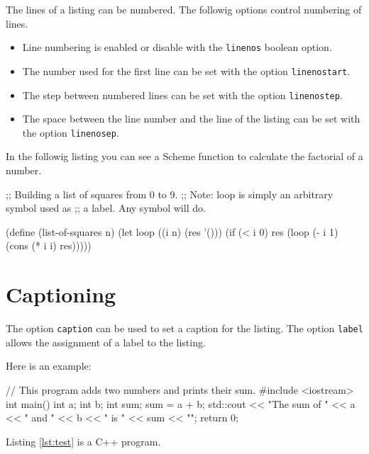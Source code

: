 \documentclass[10pt,a4paper]{article}
\begin{document}
The lines of a listing can be numbered. The followig options control
numbering of lines.
\begin{itemize}
  \item Line numbering is enabled or disable with the \verb|linenos|
  boolean option.
  \item The number used for the first line can be set with the option
  \verb|linenostart|.
  \item The step between numbered lines can be set with the option
  \verb|linenostep|.
  \item The space between the line number and the line of the listing
  can be set with the option \verb|linenosep|.
\end{itemize}

In the followig listing you can see a Scheme function to calculate the
factorial of a number.

\begin{Example}
\begin{pygmented}[lang=scheme,linenos,linenostart=1001,linenostep=2,linenosep=5mm]
;; Building a list of squares from 0 to 9.
;; Note: loop is simply an arbitrary symbol used as
;; a label. Any symbol will do.
 
(define (list-of-squares n)
  (let loop ((i n) (res '()))
    (if (< i 0)
        res
        (loop (- i 1) (cons (* i i) res)))))
\end{pygmented}
\end{Example}

\section{Captioning}

The option \verb|caption| can be used to set a caption for the listing.
The option \verb|label| allows the assignment of a label to the listing.

Here is an example:

\begin{Example}
\begin{pygmented}[lang=c++,label=lst:test,caption=A \textbf{C++} example]
// This program adds two numbers and prints their sum.
#include <iostream>
int main()
{
  int a;
  int b;
  int sum;
  sum = a + b;
  std::cout << "The sum of " << a << " and " << b
            << " is " << sum << "\n";
  return 0;
}
\end{pygmented}
\end{Example}

\begin{Example}
  Listing \ref{lst:test} is a C++ program.
\end{Example}
\end{document}
